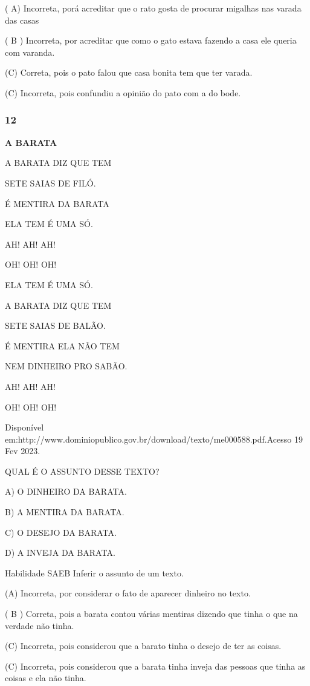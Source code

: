 ( A) Incorreta, porá acreditar que o rato gosta de procurar migalhas nas
varada das casas

( B ) Incorreta, por acreditar que como o gato estava fazendo a casa ele
queria com varanda.

(C) Correta, pois o pato falou que casa bonita tem que ter varada.

(C) Incorreta, pois confundiu a opinião do pato com a do bode.

\subsubsection{12}\label{section-52}

\textbf{A BARATA}

A BARATA DIZ QUE TEM

SETE SAIAS DE FILÓ.

É MENTIRA DA BARATA

ELA TEM É UMA SÓ.

AH! AH! AH!

OH! OH! OH!

ELA TEM É UMA SÓ.

A BARATA DIZ QUE TEM

\protect\hypertarget{_heading=h.nmf14n}{}{}SETE SAIAS DE BALÃO.

É MENTIRA ELA NÃO TEM

NEM DINHEIRO PRO SABÃO.

AH! AH! AH!

OH! OH! OH!

Disponível
em:http://www.dominiopublico.gov.br/download/texto/me000588.pdf.Acesso
19 Fev 2023.

QUAL É O ASSUNTO DESSE TEXTO?

A) O DINHEIRO DA BARATA.

B) A MENTIRA DA BARATA.

C) O DESEJO DA BARATA.

D) A INVEJA DA BARATA.

Habilidade SAEB Inferir o assunto de um texto.

(A) Incorreta, por considerar o fato de aparecer dinheiro no texto.

( B ) Correta, pois a barata contou várias mentiras dizendo que tinha o
que na verdade não tinha.

(C) Incorreta, pois considerou que a barato tinha o desejo de ter as
coisas.

(C) Incorreta, pois considerou que a barata tinha inveja das pessoas que
tinha as coisas e ela não tinha.

